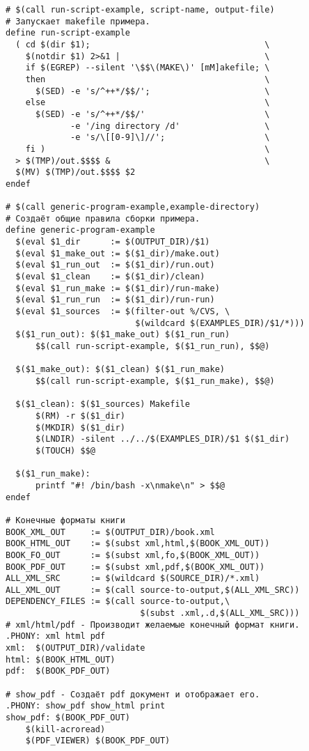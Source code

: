 {\begin{verbatim}
# $(call run-script-example, script-name, output-file)
# Запускает makefile примера.
define run-script-example
  ( cd $(dir $1);                                   \
    $(notdir $1) 2>&1 |                             \
    if $(EGREP) --silent '\$$\(MAKE\)' [mM]akefile; \
    then                                            \
      $(SED) -e 's/^++*/$$/';                       \
    else                                            \
      $(SED) -e 's/^++*/$$/'                        \
             -e '/ing directory /d'                 \
             -e 's/\[[0-9]\]//';                    \
    fi )                                            \
  > $(TMP)/out.$$$$ &                               \
  $(MV) $(TMP)/out.$$$$ $2
endef

# $(call generic-program-example,example-directory)
# Создаёт общие правила сборки примера.
define generic-program-example
  $(eval $1_dir      := $(OUTPUT_DIR)/$1)
  $(eval $1_make_out := $($1_dir)/make.out)
  $(eval $1_run_out  := $($1_dir)/run.out)
  $(eval $1_clean    := $($1_dir)/clean)
  $(eval $1_run_make := $($1_dir)/run-make)
  $(eval $1_run_run  := $($1_dir)/run-run)
  $(eval $1_sources  := $(filter-out %/CVS, \
                          $(wildcard $(EXAMPLES_DIR)/$1/*)))
  $($1_run_out): $($1_make_out) $($1_run_run)
      $$(call run-script-example, $($1_run_run), $$@)

  $($1_make_out): $($1_clean) $($1_run_make)
      $$(call run-script-example, $($1_run_make), $$@)

  $($1_clean): $($1_sources) Makefile
      $(RM) -r $($1_dir)
      $(MKDIR) $($1_dir)
      $(LNDIR) -silent ../../$(EXAMPLES_DIR)/$1 $($1_dir)
      $(TOUCH) $$@

  $($1_run_make):
      printf "#! /bin/bash -x\nmake\n" > $$@
endef

# Конечные форматы книги
BOOK_XML_OUT     := $(OUTPUT_DIR)/book.xml
BOOK_HTML_OUT    := $(subst xml,html,$(BOOK_XML_OUT))
BOOK_FO_OUT      := $(subst xml,fo,$(BOOK_XML_OUT))
BOOK_PDF_OUT     := $(subst xml,pdf,$(BOOK_XML_OUT))
ALL_XML_SRC      := $(wildcard $(SOURCE_DIR)/*.xml)
ALL_XML_OUT      := $(call source-to-output,$(ALL_XML_SRC))
DEPENDENCY_FILES := $(call source-to-output,\
                           $(subst .xml,.d,$(ALL_XML_SRC)))
# xml/html/pdf - Производит желаемые конечный формат книги.
.PHONY: xml html pdf
xml:  $(OUTPUT_DIR)/validate
html: $(BOOK_HTML_OUT)
pdf:  $(BOOK_PDF_OUT)

# show_pdf - Создаёт pdf документ и отображает его.
.PHONY: show_pdf show_html print
show_pdf: $(BOOK_PDF_OUT)
    $(kill-acroread)
    $(PDF_VIEWER) $(BOOK_PDF_OUT)


\end{verbatim}}
